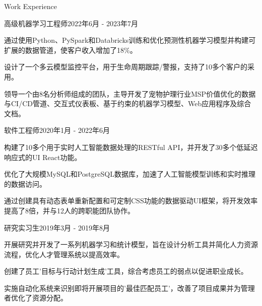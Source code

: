 \documentclass{resume} %
\begin{document}
    \begin{rSection}{Work Experience}
                    \begin{rSubsection}
                {高级机器学习工程师}{2022年6月 - 2023年7月}
                                    {}
                                {}
                                    \item 通过使用Python、PySpark和Databricks训练和优化预测性机器学习模型并构建可扩展的数据管道，使客户收入增加了18\%。
                                    \item 设计了一个多云模型监控平台，用于生命周期跟踪/警报，支持了10多个客户的采用。
                                    \item 领导一个由8名分析师组成的团队，主导开发了宠物护理行业MSP价值优化的数据与CI/CD管道、交互式仪表板、基于约束的机器学习模型、Web应用程序及综合文档。
                            \end{rSubsection}
                    \begin{rSubsection}
                {软件工程师}{2020年1月 - 2022年6月}
                                    {}
                                {}
                                    \item 构建了10多个用于实时人工智能数据处理的RESTful API，并开发了30多个低延迟响应式的UI React功能。
                                    \item 优化了大规模MySQL和PostgreSQL数据库，加速了人工智能模型训练和实时推理的数据访问。
                                    \item 通过创建具有动态表单重新配置和可定制CSS功能的数据驱动UI框架，将开发效率提高了8倍，并与12人的跨职能团队协作。
                            \end{rSubsection}
                    \begin{rSubsection}
                {研究实习生}{2019年3月 - 2019年8月}
                                    {}
                                {}
                                    \item 开展研究并开发了一系列机器学习和统计模型，旨在设计分析工具并简化人力资源流程，优化人才管理系统以提高效率。
                                    \item 创建了员工'目标与行动计划生成'工具，综合考虑员工的弱点以促进职业成长。
                                    \item 实施自动化系统来识别即将开展项目的'最佳匹配员工'，改善了项目成果并为管理者优化了资源分配。
                            \end{rSubsection}
            \end{rSection}
\end{document}
